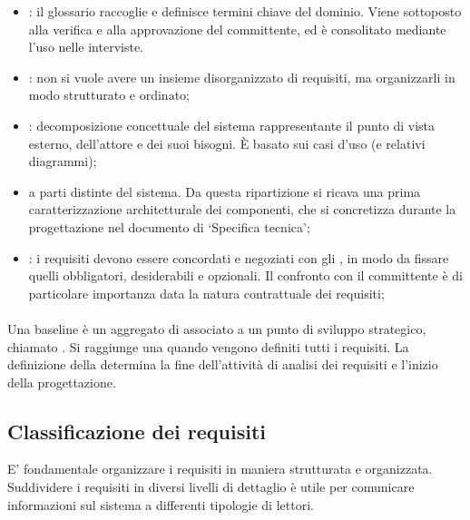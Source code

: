 \begin{itemize}
  \item {}: il glossario raccoglie e definisce
    termini chiave del dominio. Viene sottoposto alla verifica e alla
    approvazione del committente, ed è consolitato mediante l'uso
    nelle interviste.
  \item {}: non si vuole avere un
    insieme disorganizzato di requisiti, ma organizzarli in modo
    strutturato e ordinato;
  \item {}: 
    decomposizione concettuale del sistema rappresentante il punto di vista
    esterno, dell'attore e dei suoi bisogni. È basato sui casi d'uso (e
    relativi diagrammi);
  \item {} a parti distinte del sistema.
  Da questa ripartizione si ricava una prima caratterizzazione architetturale
  dei componenti, che si concretizza durante la progettazione nel documento di
  `Specifica tecnica';
  \item {}:
    i requisiti devono essere concordati e negoziati con gli
    , in modo da fissare quelli obbligatori, desiderabili
    e opzionali. Il confronto con il committente è di particolare importanza
    data la natura contrattuale dei requisiti;
\end{itemize}

\paragraph{}
\label{par:requirements_baseline}

Una baseline è un aggregato di  associato a un
punto di sviluppo strategico, chiamato . Si raggiunge una
 quando vengono definiti tutti i requisiti.
La definizione della  determina la fine
dell'attività di analisi dei requisiti e l'inizio della progettazione.

\subsection{Classificazione dei requisiti}
\label{sub:classificazione_dei_requisiti}

E' fondamentale organizzare i requisiti in maniera strutturata e organizzata.
Suddividere i requisiti in diversi livelli di dettaglio è utile per comunicare
informazioni sul sistema a differenti tipologie di lettori.

